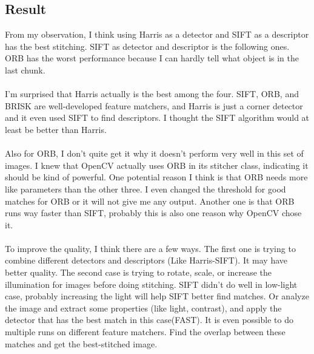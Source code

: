 \documentclass{article}
\begin{document}
\subsection*{Result}
From my observation, I think using Harris as a detector and SIFT as a descriptor has the best stitching.
SIFT as detector and descriptor is the following ones. ORB has the worst performance because I can hardly tell what object is in the last chunk.\\
\\
I'm surprised that Harris actually is the best among the four.
SIFT, ORB, and BRISK are well-developed feature matchers, and Harris is just a corner detector and it even used SIFT to find descriptors.
I thought the SIFT algorithm would at least be better than Harris.\\
\\
Also for ORB, I don't quite get it why it doesn't perform very well in this set of images.
I knew that OpenCV actually uses ORB in its stitcher class, indicating it should be kind of powerful.
One potential reason I think is that ORB needs more like parameters than the other three.
I even changed the threshold for good matches for ORB or it will not give me any output.
Another one is that ORB runs way faster than SIFT, probably this is also one reason why OpenCV chose it.\\
\\
To improve the quality, I think there are a few ways.
The first one is trying to combine different detectors and descriptors (Like Harris-SIFT). It may have better quality.
The second case is trying to rotate, scale, or increase the illumination for images before doing stitching.
SIFT didn't do well in low-light case, probably increasing the light will help SIFT better find matches.
Or analyze the image and extract some properties (like light, contrast), and apply the detector that has the best match in this case(FAST).
It is even possible to do multiple runs on different feature matchers.
Find the overlap between these matches and get the best-stitched image.
\end{document}
